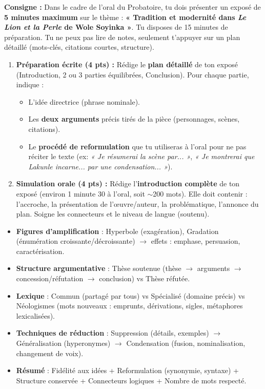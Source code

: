 \documentclass[11pt]{article}
\begin{document}
\begin{exercice}
\textbf{Consigne :} Dans le cadre de l'oral du Probatoire, tu dois présenter un exposé de \textbf{5 minutes maximum} sur le thème : \textbf{« Tradition et modernité dans \emph{Le Lion et la Perle} de Wole Soyinka »}.
Tu disposes de 15 minutes de préparation. Tu ne peux pas lire de notes, seulement t'appuyer sur un plan détaillé (mots-clés, citations courtes, structure).

\begin{enumerate}
    \item \textbf{Préparation écrite (4 pts) :} Rédige le \textbf{plan détaillé} de ton exposé (Introduction, 2 ou 3 parties équilibrées, Conclusion). Pour chaque partie, indique :
    \begin{itemize}
        \item L'idée directrice (phrase nominale).
        \item Les \textbf{deux arguments} précis tirés de la pièce (personnages, scènes, citations).
        \item Le \textbf{procédé de reformulation} que tu utiliseras à l'oral pour ne pas réciter le texte (ex: \emph{« Je résumerai la scène par... »}, \emph{« Je montrerai que Lakunle incarne... par une condensation... »}).
    \end{itemize}
    \item \textbf{Simulation orale (4 pts) :} Rédige l'\textbf{introduction complète} de ton exposé (environ 1 minute 30 à l'oral, soit $\sim$200 mots). Elle doit contenir : l'accroche, la présentation de l'œuvre/auteur, la problématique, l'annonce du plan. Soigne les connecteurs et le niveau de langue (soutenu).
\end{enumerate}
\end{exercice}

\begin{aretenir}
\begin{itemize}
    \item \textbf{Figures d'amplification} : Hyperbole (exagération), Gradation (énumération croissante/décroissante) $\rightarrow$ effets : emphase, persuasion, caractérisation.
    \item \textbf{Structure argumentative} : Thèse soutenue (thèse $\rightarrow$ arguments $\rightarrow$ concession/réfutation $\rightarrow$ conclusion) vs Thèse réfutée.
    \item \textbf{Lexique} : Commun (partagé par tous) vs Spécialisé (domaine précis) vs Néologismes (mots nouveaux : emprunts, dérivations, sigles, métaphores lexicalisées).
    \item \textbf{Techniques de réduction} : Suppression (détails, exemples) $\rightarrow$ Généralisation (hyperonymes) $\rightarrow$ Condensation (fusion, nominalisation, changement de voix).
    \item \textbf{Résumé} : Fidélité aux idées + Reformulation (synonymie, syntaxe) + Structure conservée + Connecteurs logiques + Nombre de mots respecté.
\end{itemize}
\end{aretenir}
\end{document}
